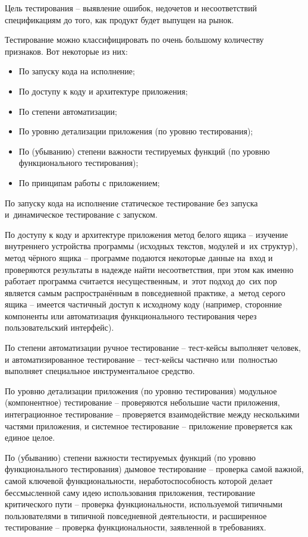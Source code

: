 \documentclass{ou}
\begin{document}
Цель тестирования -- выявление ошибок, недочетов и несоответствий спецификациям до того, как продукт будет выпущен на рынок.

Тестирование можно классифицировать по очень большому количеству признаков. Вот некоторые из них:
\begin{itemize}[label=-, leftmargin=0em, itemindent=3.35em, nosep]
\item По запуску кода на исполнение;
\item По доступу к коду и архитектуре приложения;
\item По степени автоматизации;
\item По уровню детализации приложения (по уровню тестирования);
\item По (убыванию) степени важности тестируемых функций (по уровню функционального тестирования);
\item По принципам работы с приложением;
\end{itemize}

По запуску кода на исполнение статическое тестирование без запуска и~динамическое тестирование с запуском.

По доступу к коду и архитектуре приложения метод белого ящика -- изучение внутреннего устройства программы (исходных текстов, модулей и~их структур), метод чёрного ящика -- программе подаются некоторые данные на~вход и проверяются результаты в надежде найти несоответствия, при этом как именно работает программа считается несущественным, и~этот подход до~сих пор является самым распространённым в повседневной практике, а~метод серого ящика -- имеется частичный доступ к исходному коду (например, сторонние компоненты или автоматизация функционального тестирования через пользовательский интерфейс).

По степени автоматизации ручное тестирование -- тест-кейсы выполняет человек, и автоматизированное тестирование -- тест-кейсы частично или~полностью выполняет специальное инструментальное средство.

По уровню детализации приложения (по уровню тестирования) модульное (компонентное) тестирование -- проверяются небольшие части приложения, интеграционное тестирование -- проверяется взаимодействие между несколькими частями приложения, и системное тестирование -- приложение проверяется как единое целое.

По (убыванию) степени важности тестируемых функций (по уровню функционального тестирования) дымовое тестирование -- проверка самой важной, самой ключевой функциональности, неработоспособность которой делает бессмысленной саму идею использования приложения, тестирование критического пути -- проверка функциональности, используемой типичными пользователями в типичной повседневной деятельности, и расширенное тестирование -- проверка функциональности, заявленной в требованиях.
\end{document}
